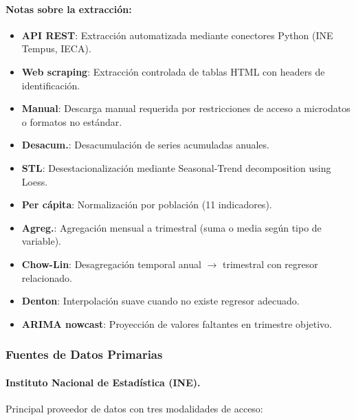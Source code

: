 \documentclass[authoryear,12pt]{elsarticle}
\begin{document}
\paragraph{Notas sobre la extracción:}
\begin{itemize}
    \item \textbf{API REST}: Extracción automatizada mediante conectores Python (INE Tempus, IECA).
    \item \textbf{Web scraping}: Extracción controlada de tablas HTML con headers de identificación.
    \item \textbf{Manual}: Descarga manual requerida por restricciones de acceso a microdatos o formatos no estándar.
    \item \textbf{Desacum.}: Desacumulación de series acumuladas anuales.
    \item \textbf{STL}: Desestacionalización mediante Seasonal-Trend decomposition using Loess.
    \item \textbf{Per cápita}: Normalización por población (11 indicadores).
    \item \textbf{Agreg.}: Agregación mensual a trimestral (suma o media según tipo de variable).
    \item \textbf{Chow-Lin}: Desagregación temporal anual $\to$ trimestral con regresor relacionado.
    \item \textbf{Denton}: Interpolación suave cuando no existe regresor adecuado.
    \item \textbf{ARIMA nowcast}: Proyección de valores faltantes en trimestre objetivo.
\end{itemize}

\subsubsection{Fuentes de Datos Primarias}

\paragraph{Instituto Nacional de Estadística (INE).} Principal proveedor de datos con tres modalidades de acceso:
\end{document}
